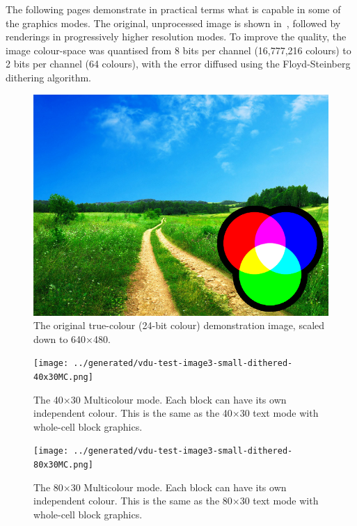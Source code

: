 The following pages demonstrate in practical terms what is capable in some of
the graphics modes. The original, unprocessed image is shown
in~, followed by renderings in progressively higher
resolution modes. To improve the quality, the image colour-space was quantised
from 8 bits per channel (16,777,216 colours) to 2 bits per channel (64
colours), with the error diffused using the Floyd-Steinberg dithering
algorithm.

\ifxetex
  \begin{figure}
    \centering
    \includegraphics[width=0.9\columnwidth]{figs/vdu-test-image3-original.png}%
    \caption[Original 640×480 demonstration image]
            {\label{fig:vdu:mode-original}The original true-colour (24-bit colour)
      demonstration image, scaled down to 640×480.
    }
  \end{figure}
  
  \begin{figure}[p]
    \centering
    \texttt{[image: ../generated/vdu-test-image3-small-dithered-40x30MC.png]}%
    \caption[40×30 Multicolour mode]
            {\label{fig:vdu:mode-40x30mc}The 40×30 Multicolour mode.
              Each block can have its own independent colour.
              This is the same as the 40×30 text mode with whole-cell block graphics.
    }
  \end{figure}
  
  \begin{figure}[p]
    \centering
    \texttt{[image: ../generated/vdu-test-image3-small-dithered-80x30MC.png]}%
    \caption[80×30 Multicolour mode]{\label{fig:vdu:mode-80x30mc}The 80×30 Multicolour mode.
      Each block can have its own independent colour.
      This is the same as the 80×30 text mode with whole-cell block graphics.
    }
  \end{figure}
  

